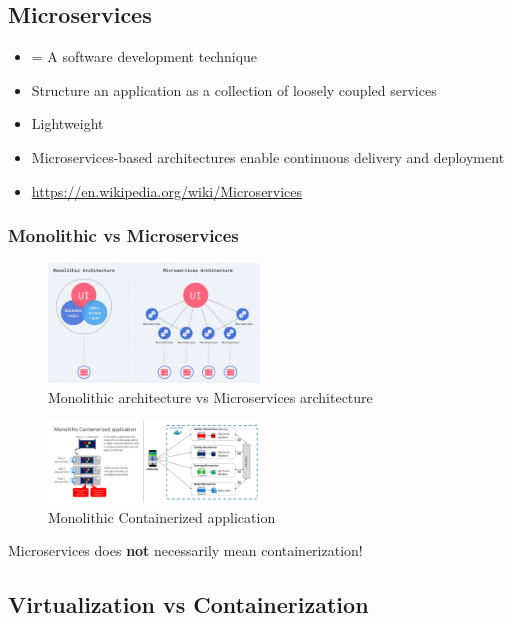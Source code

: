 \documentclass{article}
\newcommand{\bold}[1]{\textbf{#1}}
\begin{document}
\subsection{Microservices}

\begin{itemize}
    \item = A software development technique
    \item Structure an application as a collection of loosely coupled services
    \item Lightweight
    \item Microservices-based architectures enable continuous delivery and deployment
    \item \url{https://en.wikipedia.org/wiki/Microservices}
\end{itemize}

\subsubsection{Monolithic vs Microservices}

\begin{figure}[H]
    \centering
    \includegraphics[width=0.5\textwidth]{monolithic-vs-microservices.png}
    \caption{Monolithic architecture vs Microservices architecture}
\end{figure}

\begin{figure}[H]
    \centering
    \includegraphics[width=0.5\textwidth]{monolithic-vs-microservices2.png}
    \caption{Monolithic Containerized application}
\end{figure}

Microservices does \bold{not} necessarily mean containerization!

\subsection{Virtualization vs Containerization}
\end{document}

